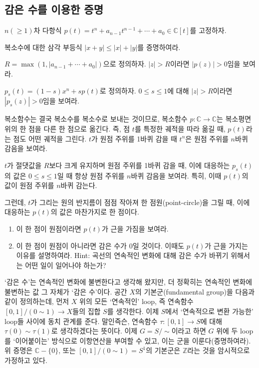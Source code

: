 \subsection{감은 수를 이용한 증명}
$n(\geq 1)$차 다항식 $p(t)=t^n+a_{n-1}t^{n-1}+\cdots+a_0\in \mathbb{C}[t]$를 고정하자. 
\begin{exercise}
복소수에 대한 삼각 부등식 $|x+y| \leq |x|+|y|$를 증명하여라. 
\end{exercise}
\begin{exercise}
    $R=\max(1, |a_{n-1}+\cdots+a_0|)$으로 정의하자. $|z|>R$이라면 $|p(z)|>0$임을 보여라. 
\end{exercise}
\begin{exercise}
    $p_s(t)=(1-s)x^n+sp(t)$로 정의하자. $0\leq s \leq 1$에 대해 $|z|>R$이라면 $|p_s(z)|>0$임을 보여라.
\end{exercise}
\begin{exercise}
    복소함수는 결국 복소수를 복소수로 보내는 것이므로, 복소함수 $p: \mathbb{C}\to \mathbb{C}$는 복소평면 위의 한 점을 다른 한 점으로 옮긴다. 즉, 점 $t$를 특정한 궤적을 따라 옮길 때, $p(t)$라는 점도 어떤 궤적을 그린다. $t$가 원점 주위를 1바퀴 감을 때 $t^n$은 원점 주위를 $n$바퀴 감음을 보여라. 
\end{exercise}
\begin{exercise}
    $t$가 절댓값을 $R$보다 크게 유지하며 원점 주위를 1바퀴 감을 때, 이에 대응하는 $p_s(t)$의 값은 $0\leq s \leq 1$일 때 항상 원점 주위를 $n$바퀴 감음을 보여라. 특히, 이때 $p(t)$의 값이 원점 주위를 $n$바퀴 감는다. 
\end{exercise}
\begin{exercise}
    그런데, $t$가 그리는 원의 반지름이 점점 작아져 한 점원(point-circle)을 그릴 때, 이에 대응하는 $p(t)$의 값은 마찬가지로 한 점이다. 
    \begin{enumerate}
        \item 이 한 점이 원점이라면 $p(t)$가 근을 가짐을 보여라. 
        \item 이 한 점이 원점이 아니라면 감은 수가 0일 것이다. 이때도 $p(t)$가 근을 가지는 이유를 설명하여라. Hint: 곡선의 연속적인 변화에 대해 감은 수가 바뀌기 위해서는 어떤 일이 일어나야 하는가?
    \end{enumerate}
\end{exercise}
\begin{remark}
    `감은 수'는 연속적인 변화에 불변한다고 생각해 왔지만, 더 정확히는 연속적인 변화에 불변하는 값 그 자체가 `감은 수'이다. 공간 $X$의 기본군(fundamental group)을 다음과 같이 정의하는데, 먼저 $X$ 위의 모든 `연속적인' loop, 즉 연속함수 $[0, 1]/(0\sim 1)\to X$들의 집합 $S$를 생각한다. 이제 $S$에서 `연속적으로 변환 가능한' loop들 사이에 동치 관계를 준다. 말인즉슨, 연속함수 $\tau: [0, 1]\to S$에 대해 $\tau(0)\sim \tau(1)$로 생각하겠다는 뜻이다. 이제 $G=S/\sim$이라고 하면 $G$ 위에 두 loop를 `이어붙이는' 방식으로 이항연산을 부여할 수 있고, 이는 군을 이룬다(증명하여라). 위 증명은 $\mathbb{C}-\{0\}$, 또는 $[0, 1]/(0\sim 1)=S^1$의 기본군은 $\mathbb{Z}$라는 것을 암시적으로 가정하고 있다. 
\end{remark}
